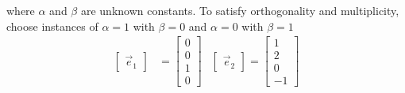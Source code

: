 \documentclass[11pt]{homework}
\begin{document}
where $\alpha$ and $\beta$ are unknown constants. 
To satisfy orthogonality and multiplicity, choose instances of
$\alpha=1$ with $ \beta =0$ 
and
$\alpha=0$ with $ \beta =1$ 
\begin{align*}
  \begin{bmatrix}
  \vec e_1
  \end{bmatrix}
  &= 
  \begin{bmatrix}
  0 \\
  0 \\
  1 \\
  0
  \end{bmatrix}
  &
  \begin{bmatrix}
  \vec e_2
  \end{bmatrix}
  = 
  \begin{bmatrix}
  1 \\
  2 \\
  0 \\
  -1
  \end{bmatrix}
\end{align*}
\end{document}
